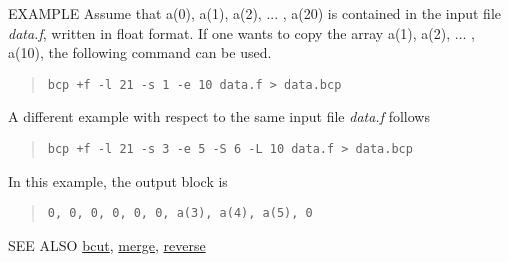 \begin{qsection}{EXAMPLE}
Assume that {a(0), a(1), a(2), ... , a(20)}
 is contained in the input file {\em data.f}, written in float format.
If one wants to copy the array {a(1), a(2), ... , a(10)},
the following command can be used.
\begin{quote}
\verb!bcp +f -l 21 -s 1 -e 10 data.f > data.bcp!
\end{quote}

\par
A different example with respect to the same input file {\em data.f}
follows

\begin{quote}
\verb!bcp +f -l 21 -s 3 -e 5 -S 6 -L 10 data.f > data.bcp!
\end{quote}

In this example, the output block is
\begin{quote}
\verb!0, 0, 0, 0, 0, 0, a(3), a(4), a(5), 0!
\end{quote}
\end{qsection}

\begin{qsection}{SEE ALSO}
\hyperlink{bcut}{bcut},
\hyperlink{merge}{merge},
\hyperlink{reverse}{reverse}
\end{qsection}
